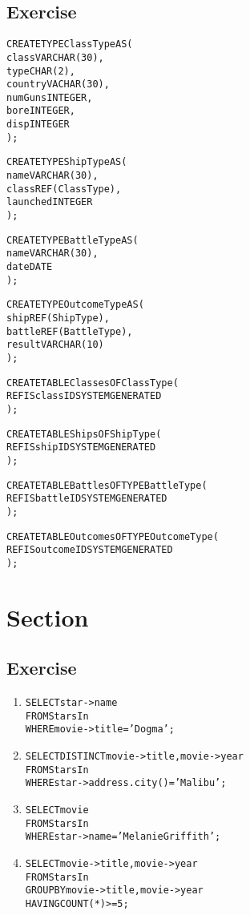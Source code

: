\setcounter{subsection}{5}
\subsection*{Exercise \thesubsection}
\begin{alltt}
CREATE TYPE ClassType AS (
  class       VARCHAR(30),
  type        CHAR(2),
  country     VACHAR(30),
  numGuns     INTEGER,
  bore        INTEGER,
  disp        INTEGER
);

CREATE TYPE ShipType AS (
  name        VARCHAR(30),
  class       REF(ClassType),
  launched    INTEGER
);

CREATE TYPE BattleType AS (
  name        VARCHAR(30),
  date        DATE
);

CREATE TYPE OutcomeType AS (
  ship        REF(ShipType),
  battle      REF(BattleType),
  result      VARCHAR(10)
);

CREATE TABLE Classes OF ClassType (
  REF IS classID SYSTEM GENERATED
);

CREATE TABLE Ships OF ShipType(
   REF IS shipID SYSTEM GENERATED
);

CREATE TABLE Battles OF TYPE BattleType(
   REF IS battleID SYSTEM GENERATED
);

CREATE TABLE Outcomes OF TYPE OutcomeType(
   REF IS outcomeID SYSTEM GENERATED
);
\end{alltt}


\setcounter{section}{5}
\section*{Section \thesection}

\setcounter{subsection}{1}
\subsection*{Exercise \thesubsection}

\begin{enumerate}
\item
\begin{alltt}
SELECT star->name
FROM   StarsIn
WHERE  movie->title = 'Dogma';
\end{alltt}
\item
\begin{alltt}
SELECT DISTINCT movie->title, movie->year
FROM   StarsIn
WHERE  star->address.city() = 'Malibu';
\end{alltt}
\item
\begin{alltt}
SELECT movie
FROM   StarsIn
WHERE  star->name = 'Melanie Griffith';
\end{alltt}
\item
\begin{alltt}
SELECT   movie->title, movie->year
FROM     StarsIn
GROUP BY movie->title, movie->year
HAVING   COUNT(*) >= 5;
\end{alltt}
\end{enumerate}

